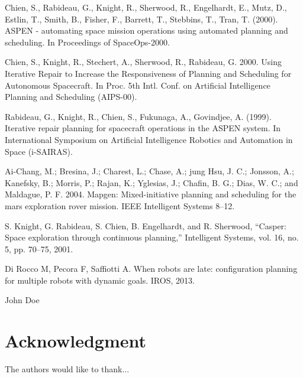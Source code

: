 \documentclass[conference]{IEEEtran}
\begin{document}
\begin{thebibliography}{1}

Chien, S., Rabideau, G., Knight, R., Sherwood, R., Engelhardt, E., Mutz, D., Estlin, T., Smith, B., Fisher, F., Barrett, T., Stebbins, T., Tran, T. (2000). ASPEN - automating space mission operations using automated planning and scheduling. In Proceedings of SpaceOps-2000.

Chien, S., Knight, R., Stechert, A., Sherwood, R., Rabideau, G. 2000. Using Iterative Repair to Increase the Responsiveness of Planning and Scheduling for Autonomous Spacecraft. In Proc. 5th Intl. Conf. on Artificial Intelligence Planning and Scheduling (AIPS-00).

Rabideau, G., Knight, R., Chien, S., Fukunaga, A., Govindjee, A. (1999). Iterative repair planning for spacecraft operations in the ASPEN system. In International Symposium on Artificial Intelligence Robotics and Automation in Space (i-SAIRAS).

Ai-Chang, M.; Bresina, J.; Charest, L.; Chase, A.; jung Hsu, J. C.; Jonsson, A.; Kanefsky, B.; Morris, P.; Rajan, K.; Yglesias, J.; Chafin, B. G.; Dias, W. C.; and Maldague, P. F. 2004. Mapgen: Mixed-initiative planning and scheduling for the mars exploration rover mission. IEEE Intelligent Systems 8–12.

S. Knight, G. Rabideau, S. Chien, B. Engelhardt, and R. Sherwood,
“Casper: Space exploration through continuous planning,” Intelligent
Systems, vol. 16, no. 5, pp. 70–75, 2001.

Di Rocco M, Pecora F, Saffiotti A. When robots are late: configuration planning for multiple robots with dynamic goals. IROS, 2013.


\end{thebibliography}


\begin{IEEEbiography}{John Doe}
\end{IEEEbiography}
\section*{Acknowledgment}
The authors would like to thank...
\end{document}
